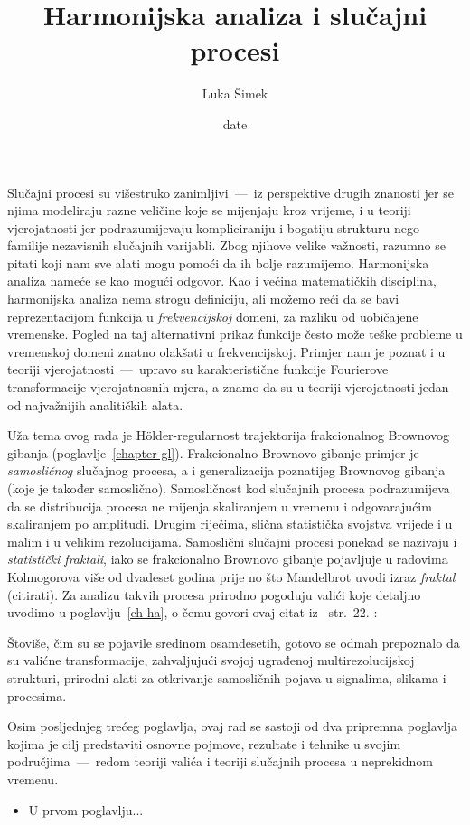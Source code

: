 \documentclass[a4paper,twoside,12pt]{memoir}
\title{Harmonijska analiza i slu\v{c}ajni procesi}
\author{Luka Šimek}
\date{date}
\let\oldcite\cite
\renewcommand{\cite}[2][]{%
    \def\tmp{#1}%
    \ifx\tmp\empty
        \mbox{\oldcite{#2}}%
    \else
        \mbox{\oldcite[\tmp]{#2}}%
    \fi
}
\numberwithin{teorem}{section}
\numberwithin{equation}{chapter}
\numberwithin{figure}{chapter}
\numberwithin{table}{chapter}
\newcommand{\holder}{H\" older}
\begin{document}
\frontmatter

\begin{intro}
	Slučajni procesi su višestruko zanimljivi~---~iz perspektive drugih znanosti jer
	se njima modeliraju razne veličine koje se mijenjaju kroz vrijeme, i u teoriji vjerojatnosti
	jer podrazumijevaju kompliciraniju i bogatiju strukturu nego familije nezavisnih
	slučajnih varijabli. Zbog njihove velike važnosti, razumno se pitati koji nam
	sve alati mogu pomoći da ih bolje razumijemo. Harmonijska analiza nameće se kao mogući odgovor.
	Kao i većina matematičkih disciplina, harmonijska analiza nema strogu definiciju, ali
	možemo reći da se bavi reprezentacijom funkcija u \emph{frekvencijskoj} domeni, za razliku
	od uobičajene vremenske. Pogled na taj alternativni prikaz funkcije često može teške
	probleme u vremenskoj domeni znatno olakšati u frekvencijskoj. Primjer nam
	je poznat i u teoriji vjerojatnosti~---~upravo su karakteristične funkcije Fourierove transformacije
	vjerojatnosnih mjera, a znamo da su u teoriji vjerojatnosti jedan od najvažnijih analitičkih alata.

	Uža tema ovog rada je \holder -regularnost trajektorija frakcionalnog Brownovog gibanja (poglavlje~\ref{chapter-gl}).
	Frakcionalno Brownovo gibanje primjer je \emph{samosličnog} slučajnog procesa, a i generalizacija poznatijeg Brownovog gibanja (koje je također samoslično). Samosličnost kod slučajnih procesa
	podrazumijeva da se distribucija procesa ne mijenja skaliranjem u vremenu i odgovarajućim skaliranjem po amplitudi. Drugim riječima, slična statistička svojstva
	vrijede i u malim i u velikim rezolucijama. Samoslični slučajni procesi ponekad se nazivaju i \emph{statistički fraktali}, iako se frakcionalno Brownovo gibanje
	pojavljuje u radovima Kolmogorova više od dvadeset godina prije no što Mandelbrot uvodi izraz \emph{fraktal} (citirati). Za analizu takvih procesa
	prirodno pogoduju valići koje detaljno uvodimo u poglavlju~\ref{ch-ha}, o čemu govori ovaj citat iz~\cite[str.~22.]{flandrin}:
	\begin{displayquote}
		Štoviše, čim su se pojavile sredinom osamdesetih, gotovo se odmah prepoznalo da su valićne transformacije,
		zahvaljujući svojoj ugrađenoj multirezolucijskoj strukturi, prirodni alati
		za otkrivanje samosličnih pojava u signalima, slikama i procesima.
	\end{displayquote}

	\bigskip
	Osim posljednjeg trećeg poglavlja, ovaj rad se sastoji od dva pripremna poglavlja kojima je cilj
	predstaviti osnovne pojmove, rezultate i tehnike u svojim područjima~---~redom teoriji valića i teoriji
	slučajnih procesa u neprekidnom vremenu.
	\begin{itemize}
		\item U prvom poglavlju...


\end{itemize}
\end{intro}
\end{document}
